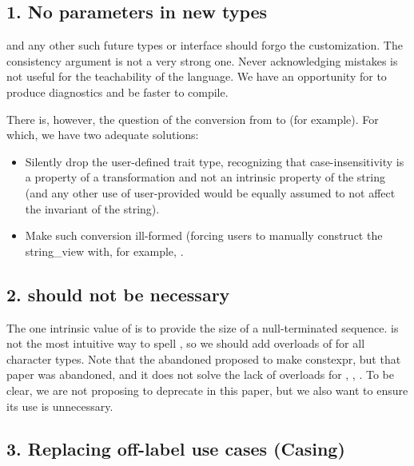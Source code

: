 \documentclass{wg21}
\begin{document}
\subsection{1. No  parameters in new types}

 and any other such future types or interface should forgo the  customization.
The consistency argument is not a very strong one. Never acknowledging mistakes is not useful for the teachability of the language.
We have an opportunity for  to produce diagnostics and be faster to compile.

There is, however, the question of the conversion from  to  (for example).
For which, we have two adequate solutions:
\begin{itemize}
\item Silently drop the user-defined trait type, recognizing that case-insensitivity is a property of a transformation and not an intrinsic property of the string (and any other use of user-provided  would be equally assumed to not affect the invariant of the string).
\item Make such conversion ill-formed (forcing users to manually construct the string_view with, for example, .
\end{itemize}

\subsection{2.  should not be necessary}

The one intrinsic value of  is to provide the size of a null-terminated sequence.
 is not the most intuitive way to spell , so we should add 
overloads of  for all character types.
Note that the abandoned  proposed to make  constexpr, but that paper was abandoned, and it does not solve
the lack of  overloads for , , .
To be clear, we are not proposing to deprecate  in this paper, but we also want to ensure its use is unnecessary.

\subsection{3. Replacing off-label  use cases (Casing)}
\end{document}
